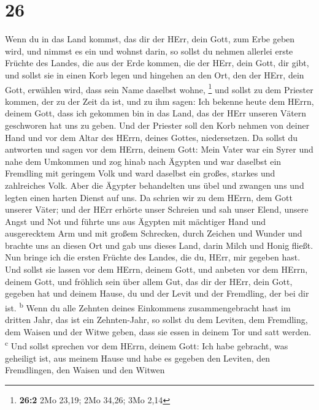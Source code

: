 \hypertarget{section-25}{%
\section{26}\label{section-25}}

 Wenn du in das Land kommst, das dir der HErr, dein Gott,
zum Erbe geben wird, und nimmst es ein und wohnst darin, 
so sollst du nehmen allerlei erste Früchte des Landes, die aus der Erde
kommen, die der HErr, dein Gott, dir gibt, und sollst sie in einen Korb
legen und hingehen an den Ort, den der HErr, dein Gott, erwählen wird,
dass sein Name daselbst wohne, \footnote{\textbf{26:2} 2Mo 23,19; 2Mo
  34,26; 3Mo 2,14}  und sollst zu dem Priester kommen, der
zu der Zeit da ist, und zu ihm sagen: Ich bekenne heute dem HErrn,
deinem Gott, dass ich gekommen bin in das Land, das der HErr unseren
Vätern geschworen hat uns zu geben.  Und der Priester soll
den Korb nehmen von deiner Hand und vor dem Altar des HErrn, deines
Gottes, niedersetzen.  Da sollst du antworten und sagen
vor dem HErrn, deinem Gott: Mein Vater war ein Syrer und nahe dem
Umkommen und zog hinab nach Ägypten und war daselbst ein Fremdling mit
geringem Volk und ward daselbst ein großes, starkes und zahlreiches
Volk.  Aber die Ägypter behandelten uns übel und zwangen
uns und legten einen harten Dienst auf uns.  Da schrien
wir zu dem HErrn, dem Gott unserer Väter; und der HErr erhörte unser
Schreien und sah unser Elend, unsere Angst und Not  und
führte uns aus Ägypten mit mächtiger Hand und ausgerecktem Arm und mit
großem Schrecken, durch Zeichen und Wunder  und brachte
uns an diesen Ort und gab uns dieses Land, darin Milch und Honig fließt.
 Nun bringe ich die ersten Früchte des Landes, die du,
HErr, mir gegeben hast. Und sollst sie lassen vor dem HErrn, deinem
Gott, und anbeten vor dem HErrn, deinem Gott,  und
fröhlich sein über allem Gut, das dir der HErr, dein Gott, gegeben hat
und deinem Hause, du und der Levit und der Fremdling, der bei dir ist.
\textsuperscript{b}  Wenn du alle Zehnten deines
Einkommens zusammengebracht hast im dritten Jahr, das ist ein
Zehnten-Jahr, so sollst du dem Leviten, dem Fremdling, dem Waisen und
der Witwe geben, dass sie essen in deinem Tor und satt werden.
\textsuperscript{c}  Und sollst sprechen vor dem HErrn,
deinem Gott: Ich habe gebracht, was geheiligt ist, aus meinem Hause und
habe es gegeben den Leviten, den Fremdlingen, den Waisen und den Witwen
